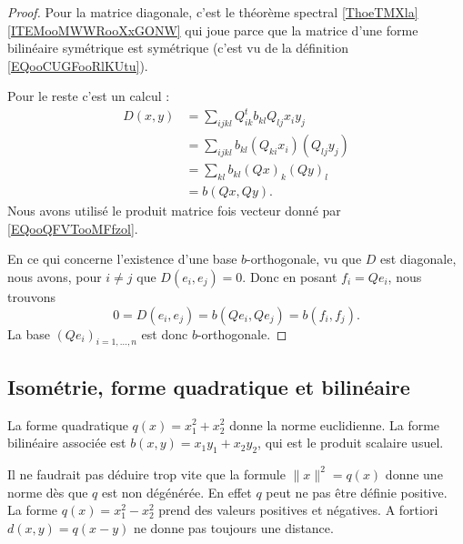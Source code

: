\begin{proof}
    Pour la matrice diagonale, c'est le théorème spectral \ref{ThoeTMXla}\ref{ITEMooMWWRooXxGONW} qui joue parce que la matrice d'une forme bilinéaire symétrique est symétrique (c'est vu de la définition \eqref{EQooCUGFooRlKUtu}).

    Pour le reste c'est un calcul :
    \begin{subequations}
        \begin{align}
            D(x,y)&=\sum_{ijkl}Q^t_{ik}b_{kl}Q_{lj}x_iy_j\\
            &=\sum_{ijkl}b_{kl}(Q_{ki}x_i)(Q_{lj}y_j)\\
            &=\sum_{kl}b_{kl}(Qx)_k(Qy)_l\\
            &=b(Qx,Qy).
        \end{align}
    \end{subequations}
    Nous avons utilisé le produit matrice fois vecteur donné par \eqref{EQooQFVTooMFfzol}.
    
         En ce qui concerne l'existence d'une base \( b\)-orthogonale, vu que \( D\) est diagonale, nous avons, pour \( i\neq j\) que \( D(e_i,e_j)=0\). Donc en posant \( f_i=Qe_i\), nous trouvons
     \begin{equation}
         0=D(e_i,e_j)=b(Qe_i,Qe_j)=b(f_i,f_j).
     \end{equation}
     La base \( (Qe_i)_{i=1,\ldots, n}\) est donc \( b\)-orthogonale.
\end{proof}

\subsection{Isométrie, forme quadratique et bilinéaire}

\begin{example}
    La forme quadratique \( q(x)=x_1^2+x_2^2\) donne la norme euclidienne. La forme bilinéaire associée est \( b(x,y)=x_1y_1+x_2y_2\), qui est le produit scalaire usuel.
\end{example}

Il ne faudrait pas déduire trop vite que la formule \( \| x \|^2=q(x)\) donne une norme dès que \( q\) est non dégénérée. En effet \( q\) peut ne pas être définie positive. La forme \( q(x)=x_1^2-x_2^2\) prend des valeurs positives et négatives. A fortiori \( d(x,y)=q(x-y)\) ne donne pas toujours une distance.

